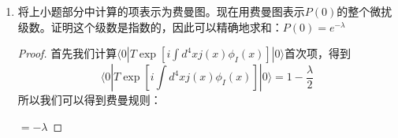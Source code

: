 \documentclass[a4paper]{article}
\newtheorem{proof}{答案}[section]
\begin{document}
\begin{enumerate}
\begin{proof}
\begin{equation}
\begin{split}
                &=1-\frac{1}{2}\int d^4xd^4yj(x)j(y)D(x-y)+\mathcal{O}(j^4)\\
                &=1-\frac{1}{2}\int d^4xd^4yj(x)j(y)\int \frac{d^3p}{(2\pi)^3}\frac{1}{2E_{\mathbf{p}}}e^{-ip\cdot(x-y)}+\mathcal{O}(j^4)\\
                &=1-\frac{1}{2}\int \frac{d^3p}{(2\pi)^3}\frac{1}{2E_{\mathbf{p}}}|\tilde{j}(p)|^2+\mathcal{O}(j^4)
            \end{split}
        \end{equation}
        所以$\langle 0|T\exp[i\int d^4xj(x)\phi_I(x)]|0\rangle=1-\frac{\lambda}{2}+\mathcal{O}(j^4)$，即$P(0)=|\langle 0|T\exp[i\int d^4xj(x)\phi_I(x)]|0\rangle|^2=1-\lambda+\mathcal{O}(j^4)$
    \end{proof}
    \item 将上小题部分中计算的项表示为费曼图。现在用费曼图表示$P(0)$的整个微扰级数。证明这个级数是指数的，因此可以精确地求和：$P(0)=e^{-\lambda}$
    \begin{proof}
        首先我们计算$\langle 0|T\exp[i\int d^4xj(x)\phi_I(x)]|0\rangle$首次项，得到
        \begin{equation}
            \langle 0|T\exp[i\int d^4x j(x)\phi_I(x)]|0\rangle=1-\frac{\lambda}{2}
        \end{equation}
        所以我们可以得到费曼规则：
        $=-\lambda$


\end{proof}
\end{enumerate}
\end{document}
